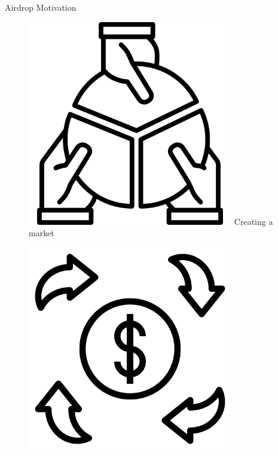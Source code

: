 \documentclass[handout]{beamer}
\begin{document}
\begin{frame}{Airdrop Motivation}
  \begin{figure}[H]
  \begin{minipage}[t]{.2\textwidth}\vspace{20pt}%
  	\center 
	\includegraphics[width=0.8\textwidth]{../assets/images/sharing.png}
	\vspace{0.8em}\vspace{0.8em}   
    Creating a market
  \end{minipage}
    \hfill
  \begin{minipage}[t]{.2\textwidth}\vspace{20pt}%
  	\center 
	\includegraphics[width=0.8\textwidth]{../assets/images/trading.png}

\end{minipage}
\end{figure}
\end{frame}
\end{document}
